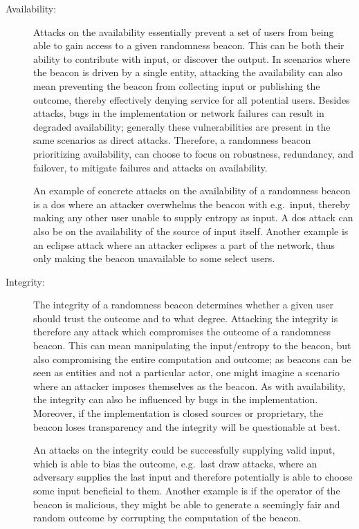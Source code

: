 \begin{description}

    \item[Availability:]
        Attacks on the availability essentially prevent a set of users from being able to gain access to a given randomness beacon.
        This can be both their ability to contribute with input, or discover the output.
        In scenarios where the beacon is driven by a single entity, attacking the availability can also mean preventing the beacon from collecting input or publishing the outcome, thereby effectively denying service for all potential users.
        Besides attacks, bugs in the implementation or network failures can result in degraded availability;
        generally these vulnerabilities are present in the same scenarios as direct attacks.
        Therefore, a randomness beacon prioritizing availability, can choose to focus on robustness, redundancy, and failover, to mitigate failures and attacks on availability.

        An example of concrete attacks on the availability of a randomness beacon is a
        \acrfull{dos} where an attacker overwhelms the beacon with e.g.\ input, thereby making any other user unable to supply entropy as input. A \gls{dos} attack can also be on the availability of the source of input itself. Another example is an eclipse attack where an attacker eclipses a part of the network, thus only making the beacon unavailable to some select users.

    \item[Integrity:]
        The integrity of a randomness beacon determines whether a given user should trust the outcome and to what degree.
        Attacking the integrity is therefore any attack which compromises the outcome of a randomness beacon.
        This can mean manipulating the input/entropy to the beacon, but also compromising the entire computation and outcome;
        as beacons can be seen as entities and not a particular actor, one might imagine a scenario where an attacker imposes themselves as the beacon.
        As with availability, the integrity can also be influenced by bugs in the implementation.
        Moreover, if the implementation is closed sources or proprietary, the beacon loses transparency and the integrity will be questionable at best.

        An attacks on the integrity could be successfully supplying valid input, which is able to bias the outcome, e.g.\ last draw attacks, where an adversary supplies the last input and therefore potentially is able to choose some input beneficial to them. Another example is
        if the operator of the beacon is malicious, they might be able to generate a seemingly fair and random outcome by corrupting the computation of the beacon.


\end{description}
